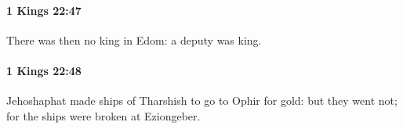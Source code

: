 		\paragraph{1 Kings 22:47} %
			\label{1KINGS-22-47}

			There was then no king in Edom: a deputy was king.


		\paragraph{1 Kings 22:48} %
			\label{1KINGS-22-48}

			Jehoshaphat made ships of Tharshish to go to Ophir for gold: but they went not; for the ships were broken at Eziongeber.


